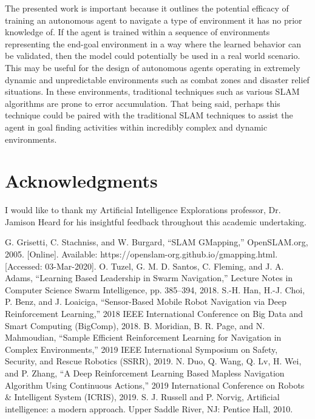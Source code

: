 \documentclass[conference]{IEEEtran}
\begin{document}
The presented work is important because it outlines the potential efficacy of training an autonomous agent to navigate a type of environment it has no prior knowledge of. If the agent is trained within a sequence of environments representing the end-goal environment in a way where the learned behavior can be validated, then the model could potentially be used in a real world scenario. This may be useful for the design of autonomous agents operating in extremely dynamic and unpredictable environments such as combat zones and disaster relief situations. In these environments, traditional techniques such as various SLAM algorithms are prone to error accumulation. That being said, perhaps this technique could be paired with the traditional SLAM techniques to assist the agent in goal finding activities within incredibly complex and dynamic environments.


\section*{Acknowledgments}
I would like to thank my Artificial Intelligence Explorations professor, Dr. Jamison Heard for his insightful feedback throughout this academic undertaking.

\begin{thebibliography}{00}
 G. Grisetti, C. Stachniss, and W. Burgard, “SLAM GMapping,” OpenSLAM.org, 2005. [Online]. Available: https://openslam-org.github.io/gmapping.html. [Accessed: 03-Mar-2020].
 O. Tuzel, G. M. D. Santos, C. Fleming, and J. A. Adams, “Learning Based Leadership in Swarm Navigation,” Lecture Notes in Computer Science Swarm Intelligence, pp. 385–394, 2018.
 S.-H. Han, H.-J. Choi, P. Benz, and J. Loaiciga, “Sensor-Based Mobile Robot Navigation via Deep Reinforcement Learning,” 2018 IEEE International Conference on Big Data and Smart Computing (BigComp), 2018.
 B. Moridian, B. R. Page, and N. Mahmoudian, “Sample Efficient Reinforcement Learning for Navigation in Complex Environments,” 2019 IEEE International Symposium on Safety, Security, and Rescue Robotics (SSRR), 2019.
 N. Duo, Q. Wang, Q. Lv, H. Wei, and P. Zhang, “A Deep Reinforcement Learning Based Mapless Navigation Algorithm Using Continuous Actions,” 2019 International Conference on Robots & Intelligent System (ICRIS), 2019.
 S. J. Russell and P. Norvig, Artificial intelligence: a modern approach. Upper Saddle River, NJ: Pentice Hall, 2010.
\end{thebibliography}


\vspace{12pt}
\end{document}
